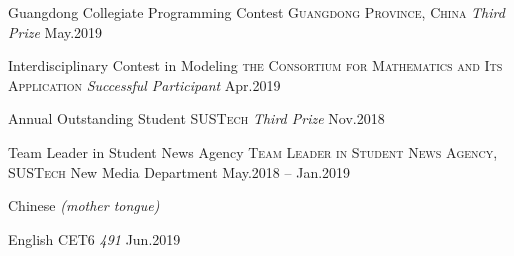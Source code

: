 \documentclass[10pt,a4paper]{article}
\begin{document}
\spacedhrule{0.5em}{-0.4em}


\headedsection
  {Guangdong Collegiate Programming Contest}
  {\textsc{Guangdong Province, China}} {%
  \headedsubsection
    {\textit {Third Prize}}
    {May.2019}
    {}
}

\headedsection
  {Interdisciplinary Contest in Modeling}
  {\textsc{the Consortium for Mathematics and Its Application}} {%
  \headedsubsection
    {\textit {Successful Participant}}
    {Apr.2019}
    {}
}

\headedsection
  {Annual Outstanding Student}
  {\textsc{SUSTech}} {%
  \headedsubsection
    {\textit {Third Prize}}
    {Nov.2018}
    {}
}


\spacedhrule{0.5em}{-0.4em}


\headedsection
  {Team Leader in Student News Agency}
  {\textsc{Team Leader in Student News Agency, SUSTech}} {%
  \headedsubsection
    {New Media Department}
    {May.2018 -- Jan.2019}
    {}
}

\spacedhrule{0.5em}{-0.4em}


\inlineheadsection %
  {Chinese}
  {\emph{(mother tongue)}}

  \headedsection
  {English}
  {} {%
  \headedsubsection
    {CET6 \emph{491}}
    {Jun.2019}
    {}
}
\end{document}
